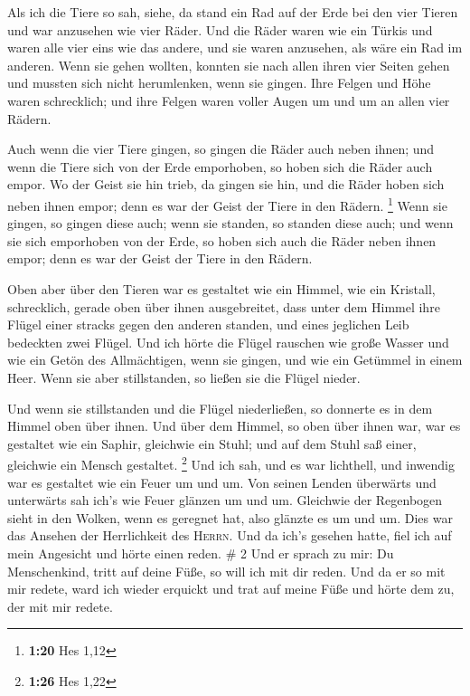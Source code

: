  Als ich die Tiere so sah, siehe, da stand ein Rad auf
der Erde bei den vier Tieren und war anzusehen wie vier Räder.
 Und die Räder waren wie ein Türkis und waren alle vier
eins wie das andere, und sie waren anzusehen, als wäre ein Rad im
anderen.  Wenn sie gehen wollten, konnten sie nach allen
ihren vier Seiten gehen und mussten sich nicht herumlenken, wenn sie
gingen.  Ihre Felgen und Höhe waren schrecklich; und ihre
Felgen waren voller Augen um und um an allen vier Rädern.

 Auch wenn die vier Tiere gingen, so gingen die Räder
auch neben ihnen; und wenn die Tiere sich von der Erde emporhoben, so
hoben sich die Räder auch empor.  Wo der Geist sie hin
trieb, da gingen sie hin, und die Räder hoben sich neben ihnen empor;
denn es war der Geist der Tiere in den Rädern. \footnote{\textbf{1:20}
  Hes 1,12}  Wenn sie gingen, so gingen diese auch; wenn
sie standen, so standen diese auch; und wenn sie sich emporhoben von der
Erde, so hoben sich auch die Räder neben ihnen empor; denn es war der
Geist der Tiere in den Rädern.

 Oben aber über den Tieren war es gestaltet wie ein
Himmel, wie ein Kristall, schrecklich, gerade oben über ihnen
ausgebreitet,  dass unter dem Himmel ihre Flügel einer
stracks gegen den anderen standen, und eines jeglichen Leib bedeckten
zwei Flügel.  Und ich hörte die Flügel rauschen wie große
Wasser und wie ein Getön des Allmächtigen, wenn sie gingen, und wie ein
Getümmel in einem Heer. Wenn sie aber stillstanden, so ließen sie die
Flügel nieder.

 Und wenn sie stillstanden und die Flügel niederließen,
so donnerte es in dem Himmel oben über ihnen.  Und über
dem Himmel, so oben über ihnen war, war es gestaltet wie ein Saphir,
gleichwie ein Stuhl; und auf dem Stuhl saß einer, gleichwie ein Mensch
gestaltet. \footnote{\textbf{1:26} Hes 1,22}  Und ich
sah, und es war lichthell, und inwendig war es gestaltet wie ein Feuer
um und um. Von seinen Lenden überwärts und unterwärts sah ich's wie
Feuer glänzen um und um.  Gleichwie der Regenbogen sieht
in den Wolken, wenn es geregnet hat, also glänzte es um und um. Dies war
das Ansehen der Herrlichkeit des \textsc{Herrn}. Und da ich's gesehen
hatte, fiel ich auf mein Angesicht und hörte einen reden. \# 2
 Und er sprach zu mir: Du Menschenkind, tritt auf deine
Füße, so will ich mit dir reden.  Und da er so mit mir
redete, ward ich wieder erquickt und trat auf meine Füße und hörte dem
zu, der mit mir redete.

